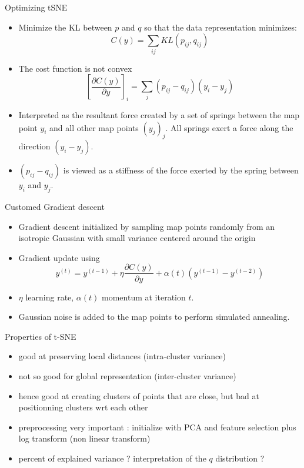 \documentclass{beamer}\usepackage[]{graphicx}\usepackage[]{color}
\begin{document}
\begin{frame}{Optimizing tSNE}
\begin{itemize}
\item Minimize the KL between $p$ and $q$ so that the data representation minimizes:
$$
C(y) = \sum_{ij} KL(p_{ij},q_{ij})
$$
\item The cost function is not convex 
$$
\left[ \frac{\partial C(y)}{\partial y} \right]_i = \sum_{j} (p_{ij}-q_{ij})(y_i - y_j)
$$
\item Interpreted as the resultant force created by a set of springs between the map point $y_i$ and all other map points $\left( y_j \right)_j$. All springs exert a force along the direction $(y_i - y_j)$.
\item $(p_{ij}-q_{ij})$ is viewed as a stiffness of the force exerted by the spring between $y_i$ and $y_j$.
\end{itemize}
\end{frame}

\begin{frame}{Customed Gradient descent}
\begin{itemize}
\item Gradient descent initialized by sampling map points randomly from an isotropic Gaussian with small variance centered around the origin
\item Gradient update using
$$
y^{(t)} = y^{(t-1)} + \eta \frac{\partial C(y)}{\partial y} + \alpha(t) (y^{(t-1)}-y^{(t-2)})
$$
\item $\eta$ learning rate, $\alpha(t)$ momentum at iteration $t$.
\item Gaussian noise is added to the map points to perform simulated annealing.
\end{itemize}
\end{frame}

\begin{frame}{Properties of t-SNE}
\begin{itemize}
\item good at preserving local distances (intra-cluster variance)
\item not so good for global representation (inter-cluster variance)
\item hence good at creating clusters of points that are close, but bad at positionning clusters wrt each other
\item preprocessing very important : initialize with PCA and feature selection plus log transform (non linear transform)
\item percent of explained variance ? interpretation of the $q$ distribution ?
\end{itemize}
\end{frame}
\end{document}
